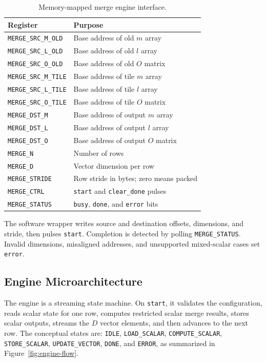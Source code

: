 \documentclass[conference]{IEEEtran}
\begin{document}
\begin{table}[t]
\centering
\caption{Memory-mapped merge engine interface.}
\label{tab:mmio}
\begin{tabular}{ll}
\toprule
Register & Purpose \\
\midrule
\texttt{MERGE\_SRC\_M\_OLD} & Base address of old $m$ array \\
\texttt{MERGE\_SRC\_L\_OLD} & Base address of old $l$ array \\
\texttt{MERGE\_SRC\_O\_OLD} & Base address of old $O$ matrix \\
\texttt{MERGE\_SRC\_M\_TILE} & Base address of tile $m$ array \\
\texttt{MERGE\_SRC\_L\_TILE} & Base address of tile $l$ array \\
\texttt{MERGE\_SRC\_O\_TILE} & Base address of tile $O$ matrix \\
\texttt{MERGE\_DST\_M} & Base address of output $m$ array \\
\texttt{MERGE\_DST\_L} & Base address of output $l$ array \\
\texttt{MERGE\_DST\_O} & Base address of output $O$ matrix \\
\texttt{MERGE\_N} & Number of rows \\
\texttt{MERGE\_D} & Vector dimension per row \\
\texttt{MERGE\_STRIDE} & Row stride in bytes; zero means packed \\
\texttt{MERGE\_CTRL} & \texttt{start} and \texttt{clear\_done} pulses \\
\texttt{MERGE\_STATUS} & \texttt{busy}, \texttt{done}, and \texttt{error} bits \\
\bottomrule
\end{tabular}
\end{table}

The software wrapper writes source and destination offsets, dimensions, and
stride, then pulses \texttt{start}. Completion is detected by polling
\texttt{MERGE\_STATUS}. Invalid dimensions, misaligned addresses, and
unsupported mixed-scalar cases set \texttt{error}.

\subsection{Engine Microarchitecture}

The engine is a streaming state machine. On \texttt{start}, it validates the
configuration, reads scalar state for one row, computes restricted scalar
merge results, stores scalar outputs, streams the $D$ vector elements, and then
advances to the next row. The conceptual states are:
\texttt{IDLE}, \texttt{LOAD\_SCALAR}, \texttt{COMPUTE\_SCALAR},
\texttt{STORE\_SCALAR}, \texttt{UPDATE\_VECTOR}, \texttt{DONE}, and
\texttt{ERROR}, as summarized in Figure~\ref{fig:engine-flow}.
\end{document}
